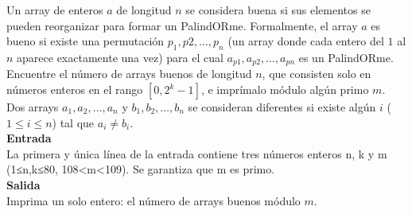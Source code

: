 \documentclass[12pt, a4paper]{article}
\begin{document}
	Un array de enteros $a$ de longitud $n$ se considera buena si sus elementos se pueden reorganizar para formar un PalindORme. Formalmente, el array $a$ es bueno si existe una permutación $p_1, p2, …, p_n$ (un array donde cada entero del $1$ al $n$ aparece exactamente una vez) para el cual $a_{p1},a_{p2},…, a_{pn}$ es un PalindORme.\\

		Encuentre el número de arrays buenos de longitud $n$, que consisten solo en números enteros en el rango $[0, 2^k − 1]$, e imprímalo módulo algún primo $m$.\\

		Dos arrays $a_1, a_2, …, a_n$ y $b_1, b_2, …, b_n$ se consideran diferentes si existe algún $i$ ($1 \le i \le n$) tal que $a_i \neq b_i$.\\

		{\bf Entrada}\\
		La primera y única línea de la entrada contiene tres números enteros n, k y m (1≤n,k≤80, 108<m<109). Se garantiza que m es primo.\\

		{\bf Salida}\\
		Imprima un solo entero: el número de arrays buenos módulo $m$.\\
		\newpage
\end{document}
